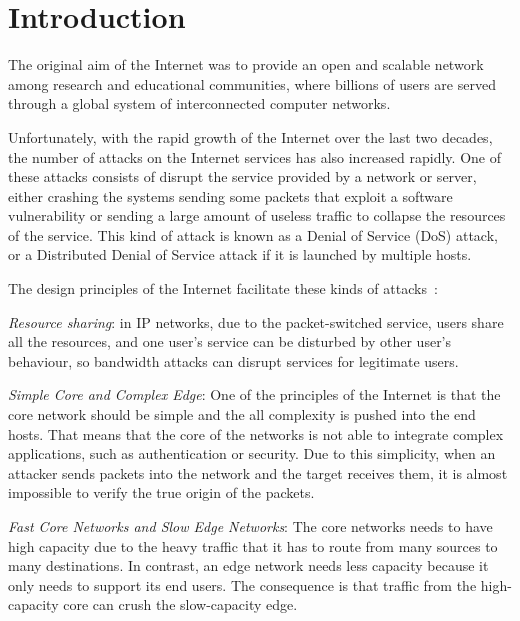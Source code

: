 
\chapter{Introduction}
\label{chapter:intro}

The original aim of the Internet was to provide an open and scalable network among research and educational communities, where billions of users are served through a global system of interconnected computer networks.

\par

Unfortunately, with the rapid growth of the Internet over the last two decades, the number of attacks on the Internet services has also increased rapidly. One of these attacks consists of disrupt the service provided by a network or server, either crashing the systems sending some packets that exploit a software vulnerability or sending a large amount of useless traffic to collapse the resources of the service. This kind of attack is known as a Denial of Service (DoS) attack, or a Distributed Denial of Service attack if it is launched by multiple hosts.

\par

The design principles of the Internet facilitate these kinds of attacks~\cite{peng2007survey}:

\par

\textit{Resource sharing}: in IP networks, due to the packet-switched service, users share all the resources, and one user's service can be disturbed by other user's behaviour, so bandwidth attacks can disrupt services for legitimate users.
\par
\textit{Simple Core and Complex Edge}: One of the principles of the Internet is that the core network should be simple and the all complexity is pushed into the end hosts. That means that the core of the networks is not able to integrate complex applications, such as authentication or security. Due to this simplicity, when an attacker sends packets into the network and the target receives them, it is almost impossible to verify the true origin of the packets.
\par
\textit{Fast Core Networks and Slow Edge Networks}: The core networks needs to have high capacity due to the heavy traffic that it has to route from many sources to many destinations. In contrast, an edge network needs less capacity because it only needs to support its end users. The consequence is that traffic from the high-capacity core can crush the slow-capacity edge.

